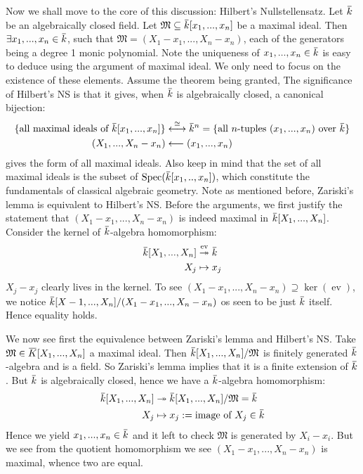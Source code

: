 \documentclass[12pt]{article}
\theoremstyle{definition}
\theoremstyle{plain}
\DeclareMathOperator{\Spec}{Spec}
\DeclareMathOperator{\ev}{ev}
\newcommand{\surj}{\twoheadrightarrow}
\newcommand{\overbar}[1]{\mkern 1.5mu\overline{\mkern-1.5mu#1\mkern-1.5mu}\mkern 1.5mu}
\renewcommand{\bar}{\overbar}
\begin{document}
Now we shall move to the core of this discussion: Hilbert's Nullstellensatz.
 Let $\bar{k}$ be an algebraically closed field. Let $\mathfrak{M}\subseteq \bar{k}[x_1, ..., x_n]$ be a maximal ideal. Then $\exists x_1, ..., x_n\in \bar{k}$, such that $\mathfrak{M}=(X_1-x_1, ..., X_n-x_n)$, each of the generators being a degree 1 monic polynomial.
\Rmk Note the uniqueness of $x_1, ..., x_n\in \bar{k}$ is easy to deduce using the argument of maximal ideal. We only need to focus on the existence of these elements. Assume the theorem being granted, The significance of Hilbert's NS is that it gives, when $\bar{k}$ is algebraically closed, a canonical bijection:
\begin{align*}
  \{\text{all maximal ideals of }\bar{k}[x_1, ..., x_n]\}&\overset{\cong}{\longleftrightarrow}\bar{k}^n=\{\text{all }n\text{-tuples } (x_1, ..., x_n)\text{ over }\bar{k}\}\\
  (X_1, ..., X_n-x_n)&\longleftarrow (x_1, ..., x_n)
\end{align*}
gives the form of all maximal ideals. Also keep in mind that the set of all maximal ideals is the subset of $\Spec(\bar{k}[x_1, .., x_n])$, which constitute the fundamentals of classical algebraic geometry. Note as mentioned before, Zariski's lemma is equivalent to Hilbert's NS. Before the arguments, we first justify the statement that $(X_1-x_1, ..., X_n-x_n)$ is indeed maximal in $\bar{k}[X_1, ..., X_n]$. Consider the kernel of $\bar{k}$-algebra homomorphism:
\begin{align*}
  \bar{k}[X_1,..., X_n]&\overset{\ev}{\surj} \bar{k}\\
  X_j&\mapsto x_j
\end{align*}
$X_j-x_j$ clearly lives in the kernel. To see $(X_1-x_1, ..., X_n-x_n)\supseteq \ker(\ev)$, we notice $\bar{k}[X-1, ..., X_n]/(X_1-x_1, ..., X_n-x_n)$ os seen to be just $\bar{k}$ itself. Hence equality holds.

\medskip
We now see first the equivalence between Zariski's lemma and Hilbert's NS.
 Take $\mathfrak{M}\in \bar{K}[X_1, ..., X_n]$ a maximal ideal. Then $\bar{k}[X_1, ..., X_n]/\mathfrak{M}$ is finitely generated $\bar{k}$-algebra and is a field. So Zariski's lemma implies that it is a finite extension of $\bar{k}$. But $\bar{k}$ is algebraically closed, hence we have a $\bar{k}$-algebra homomorphism:
\begin{align*}
  \bar{k}[X_1, ..., X_n]&\surj \bar{k}[X_1, ..., X_n]/\mathfrak{M}=\bar{k}\\
  X_j&\mapsto x_j:=\text{image of }X_j\in \bar{k}
\end{align*}
Hence we yield $x_1, ..., x_n\in\bar{k}$ and it left to check $\mathfrak{M}$ is generated by $X_i-x_i$. But we see from the quotient homomorphism we see $(X_1-x_1, ..., X_n-x_n)$ is maximal, whence two are equal. \qedhere
\end{document}
